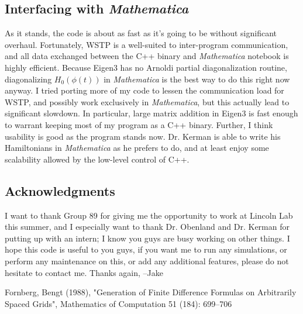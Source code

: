 \documentclass[12pt]{article}
\begin{document}
\subsection{Interfacing with \textit{Mathematica}}
As it stands, the code is about as fast as it's going to be without significant overhaul. Fortunately, WSTP is a well-suited to inter-program communication, and all data exchanged between the C++ binary and \textit{Mathematica} notebook is highly efficient. Because Eigen3 has no Arnoldi partial diagonalization routine, diagonalizing $H_0({\phi(t)})$ in \textit{Mathematica} is the best way to do this right now anyway. I tried porting more of my code to lessen the communication load for WSTP, and possibly work exclusively in \textit{Mathematica}, but this actually lead to significant slowdown. In particular, large matrix addition in Eigen3 is fast enough to warrant keeping most of my program as a C++ binary. 
\newline
\newline
Further, I think usability is good as the program stands now. Dr. Kerman is able to write his Hamiltonians in \textit{Mathematica} as he prefers to do, and at least enjoy some scalability allowed by the low-level control of C++.
\subsection{Acknowledgments}
I want to thank Group 89 for giving me the opportunity to work at Lincoln Lab this summer, and I especially want to thank Dr. Obenland and Dr. Kerman for putting up with an intern; I know you guys are busy working on other things. I hope this code is useful to you guys, if you want me to run any simulations, or perform any maintenance on this, or add any additional features, please do not hesitate to contact me. 
\newline
\newline
Thanks again,\newline
--Jake
\begin{thebibliography}{9}
Fornberg, Bengt (1988), "Generation of Finite Difference Formulas on Arbitrarily Spaced Grids", Mathematics of Computation 51 (184): 699–706


\end{thebibliography}
\end{document}
